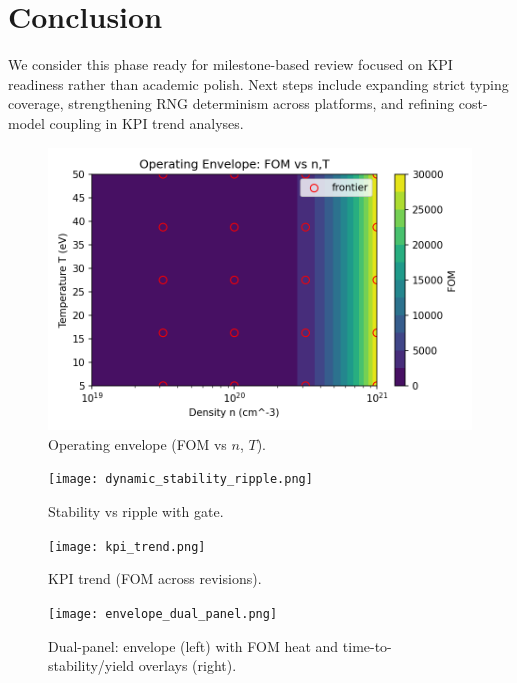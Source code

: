 \documentclass[11pt]{article}
\begin{document}
\section{Conclusion}
We consider this phase ready for milestone-based review focused on KPI readiness rather than academic polish. Next steps include expanding strict typing coverage, strengthening RNG determinism across platforms, and refining cost-model coupling in KPI trend analyses.
\begin{figure}[h]
\centering
\includegraphics[width=0.7\linewidth]{operating_envelope.png}
\caption{Operating envelope (FOM vs $n$, $T$).}\label{fig:envelope}
\end{figure}
\begin{figure}[h]
\centering
\texttt{[image: dynamic\_stability\_ripple.png]}
\caption{Stability vs ripple with gate.}\label{fig:ripple}
\end{figure}
\begin{figure}[h]
\centering
\texttt{[image: kpi\_trend.png]}
\caption{KPI trend (FOM across revisions).}\label{fig:kpi-trend}
\end{figure}
\begin{figure}[h]
\centering
\texttt{[image: envelope\_dual\_panel.png]}
\caption{Dual-panel: envelope (left) with FOM heat and time-to-stability/yield overlays (right).}
\end{figure}
\end{document}
